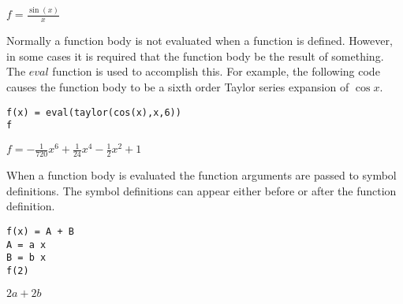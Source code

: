 \noindent
$\displaystyle f=\frac{\sin(x)}{x}$

\bigskip
\noindent
Normally a function body is not evaluated when a function is defined.
However, in some cases it is required that the function body be the
result of something.
The $eval$ function is used to accomplish this.
For example, the following code causes the function body to be a sixth order Taylor series expansion of $\cos x$.

\begin{Verbatim}[formatcom=\color{blue}]
f(x) = eval(taylor(cos(x),x,6))
f
\end{Verbatim}

\noindent
$\displaystyle f=-\frac{1}{720}x^6+\frac{1}{24}x^4-\frac{1}{2}x^2+1$

\bigskip
\noindent
When a function body is evaluated the function arguments
are passed to symbol definitions.
The symbol definitions can appear either before or after
the function definition.

\begin{Verbatim}[formatcom=\color{blue}]
f(x) = A + B
A = a x
B = b x
f(2)
\end{Verbatim}

\noindent
$\displaystyle 2a+2b$

